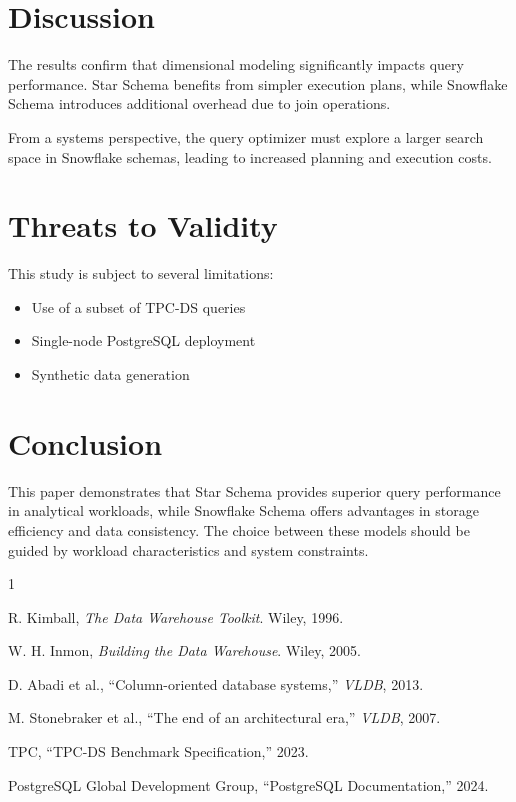 \documentclass[conference]{IEEEtran}
\begin{document}
\section{Discussion}

The results confirm that dimensional modeling significantly impacts query performance. Star Schema benefits from simpler execution plans, while Snowflake Schema introduces additional overhead due to join operations.

From a systems perspective, the query optimizer must explore a larger search space in Snowflake schemas, leading to increased planning and execution costs.

\section{Threats to Validity}

This study is subject to several limitations:
\begin{itemize}
\item Use of a subset of TPC-DS queries
\item Single-node PostgreSQL deployment
\item Synthetic data generation
\end{itemize}

\section{Conclusion}

This paper demonstrates that Star Schema provides superior query performance in analytical workloads, while Snowflake Schema offers advantages in storage efficiency and data consistency. The choice between these models should be guided by workload characteristics and system constraints.

\begin{thebibliography}{1}

R. Kimball, \textit{The Data Warehouse Toolkit}. Wiley, 1996.

W. H. Inmon, \textit{Building the Data Warehouse}. Wiley, 2005.

D. Abadi et al., “Column-oriented database systems,” \textit{VLDB}, 2013.

M. Stonebraker et al., “The end of an architectural era,” \textit{VLDB}, 2007.

TPC, “TPC-DS Benchmark Specification,” 2023.

PostgreSQL Global Development Group, “PostgreSQL Documentation,” 2024.

\end{thebibliography}
\end{document}
